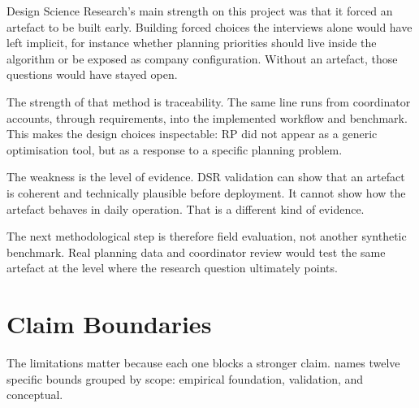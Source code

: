 Design Science Research's main strength on this project was that it forced an artefact to be built early. Building forced choices the interviews alone would have left implicit, for instance whether planning priorities should live inside the algorithm or be exposed as company configuration. Without an artefact, those questions would have stayed open.

The strength of that method is traceability. The same line runs from coordinator accounts, through requirements, into the implemented workflow and benchmark. This makes the design choices inspectable: RP did not appear as a generic optimisation tool, but as a response to a specific planning problem.

The weakness is the level of evidence. DSR validation can show that an artefact is coherent and technically plausible before deployment. It cannot show how the artefact behaves in daily operation. That is a different kind of evidence.

The next methodological step is therefore field evaluation, not another synthetic benchmark. Real planning data and coordinator review would test the same artefact at the level where the research question ultimately points.


\section{Claim Boundaries}
\label{sec:limitations}

The limitations matter because each one blocks a stronger claim.  names twelve specific bounds grouped by scope: empirical foundation, validation, and conceptual.


